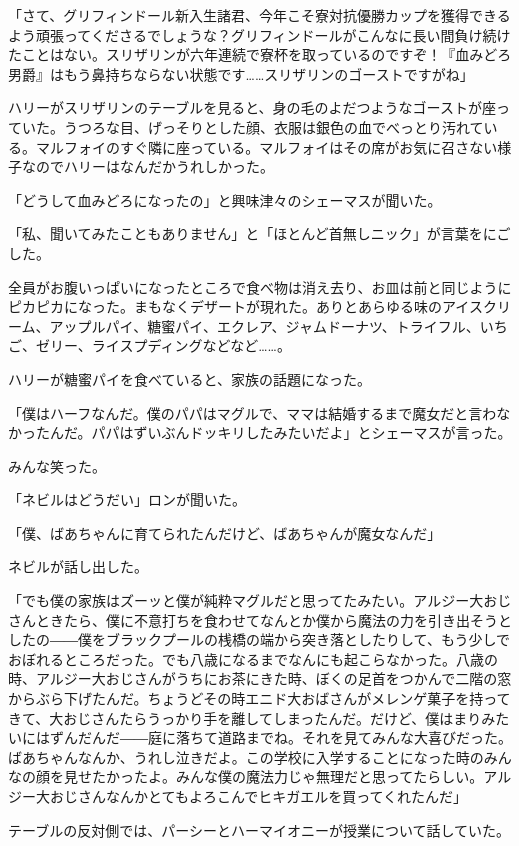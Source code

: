 \documentclass[10pt,a4paper]{article}
\begin{document}
\begin{CJK}{UTF8}{min}
「さて、グリフィンドール新入生諸君、今年こそ寮対抗優勝カップを獲得できるよう頑張ってくださるでしょうな？グリフィンドールがこんなに長い間負け続けたことはない。スリザリンが六年連続で寮杯を取っているのですぞ！『血みどろ男爵』はもう鼻持ちならない状態です……スリザリンのゴーストですがね」

ハリーがスリザリンのテーブルを見ると、身の毛のよだつようなゴーストが座っていた。うつろな目、げっそりとした顔、衣服は銀色の血でべっとり汚れている。マルフォイのすぐ隣に座っている。マルフォイはその席がお気に召さない様子なのでハリーはなんだかうれしかった。

「どうして血みどろになったの」と興味津々のシェーマスが聞いた。

「私、聞いてみたこともありません」と「ほとんど首無しニック」が言葉をにごした。

全員がお腹いっぱいになったところで食べ物は消え去り、お皿は前と同じようにピカピカになった。まもなくデザートが現れた。ありとあらゆる味のアイスクリーム、アップルパイ、糖蜜パイ、エクレア、ジャムドーナツ、トライフル、いちご、ゼリー、ライスプディングなどなど……。

ハリーが糖蜜パイを食べていると、家族の話題になった。

「僕はハーフなんだ。僕のパパはマグルで、ママは結婚するまで魔女だと言わなかったんだ。パパはずいぶんドッキリしたみたいだよ」とシェーマスが言った。

みんな笑った。

「ネビルはどうだい」ロンが聞いた。

「僕、ばあちゃんに育てられたんだけど、ばあちゃんが魔女なんだ」

ネビルが話し出した。

「でも僕の家族はズーッと僕が純粋マグルだと思ってたみたい。アルジー大おじさんときたら、僕に不意打ちを食わせてなんとか僕から魔法の力を引き出そうとしたの――僕をブラックプールの桟橋の端から突き落としたりして、もう少しでおぼれるところだった。でも八歳になるまでなんにも起こらなかった。八歳の時、アルジー大おじさんがうちにお茶にきた時、ぼくの足首をつかんで二階の窓からぶら下げたんだ。ちょうどその時エニド大おばさんがメレンゲ菓子を持ってきて、大おじさんたらうっかり手を離してしまったんだ。だけど、僕はまりみたいにはずんだんだ――庭に落ちて道路までね。それを見てみんな大喜びだった。ばあちゃんなんか、うれし泣きだよ。この学校に入学することになった時のみんなの顔を見せたかったよ。みんな僕の魔法力じゃ無理だと思ってたらしい。アルジー大おじさんなんかとてもよろこんでヒキガエルを買ってくれたんだ」

テーブルの反対側では、パーシーとハーマイオニーが授業について話していた。


\end{CJK}
\end{document}
